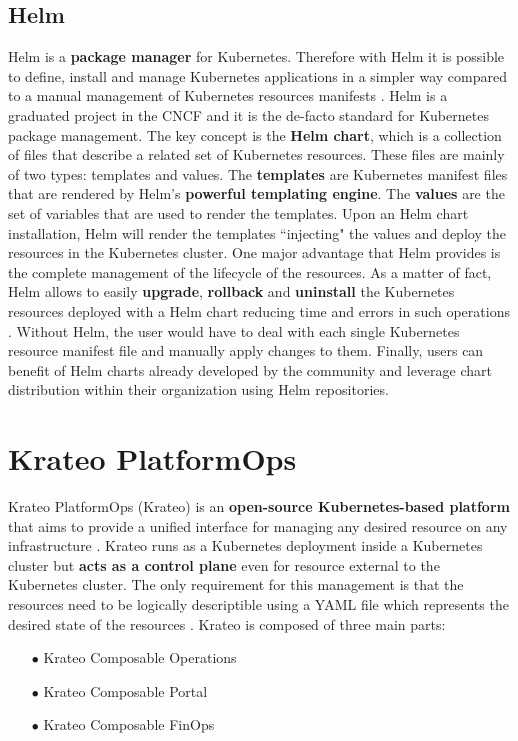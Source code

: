 \subsection{Helm}

Helm is a \textbf{package manager} for Kubernetes. Therefore with Helm it is possible to define, install and manage Kubernetes applications in a simpler way compared to a manual management of Kubernetes resources manifests \cite{helm}.
Helm is a graduated project in the CNCF and it is the de-facto standard for Kubernetes package management.
The key concept is the \textbf{Helm chart}, which is a collection of files that describe a related set of Kubernetes resources. 
These files are mainly of two types: templates and values.
The \textbf{templates} are Kubernetes manifest files that are rendered by Helm's \textbf{powerful templating engine}. 
The \textbf{values} are the set of variables that are used to render the templates.
Upon an Helm chart installation, Helm will render the templates ``injecting" the values and deploy the resources in the Kubernetes cluster. 
One major advantage that Helm provides is the complete management of the lifecycle of the resources.
As a matter of fact, Helm allows to easily \textbf{upgrade}, \textbf{rollback} and \textbf{uninstall} the Kubernetes resources deployed with a Helm chart reducing time and errors in such operations \cite{helm}. 
Without Helm, the user would have to deal with each single Kubernetes resource manifest file and manually apply changes to them.
Finally, users can benefit of Helm charts already developed by the community and leverage chart distribution within their organization using Helm repositories.

\section{Krateo PlatformOps}
\label{sec:krateo}

Krateo PlatformOps (Krateo) is an \textbf{open-source Kubernetes-based platform} that aims to provide a unified interface for managing any desired resource on any infrastructure \cite{krateo_docs}.
Krateo runs as a Kubernetes deployment inside a Kubernetes cluster but \textbf{acts as a control plane} even for resource external to the Kubernetes cluster.
The only requirement for this management is that the resources need to be logically descriptible using a YAML file which represents the desired state of the resources \cite{krateo_docs}.
Krateo is composed of three main parts:
\begin{itemize}[itemsep=0.2pt, topsep=1pt]
    \item[$\bullet$] Krateo Composable Operations
    \item[$\bullet$] Krateo Composable Portal
    \item[$\bullet$] Krateo Composable FinOps
\end{itemize}

